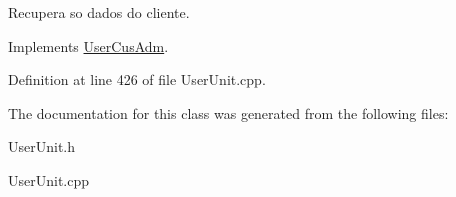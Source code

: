 Recupera so dados do cliente. 



Implements \hyperlink{classUserCusAdm_a8a67bf25c965e931be912f33449e0f8a}{User\-Cus\-Adm}.



Definition at line 426 of file User\-Unit.\-cpp.



The documentation for this class was generated from the following files\-:\begin{DoxyCompactItemize}
\item 
User\-Unit.\-h\item 
User\-Unit.\-cpp\end{DoxyCompactItemize}
